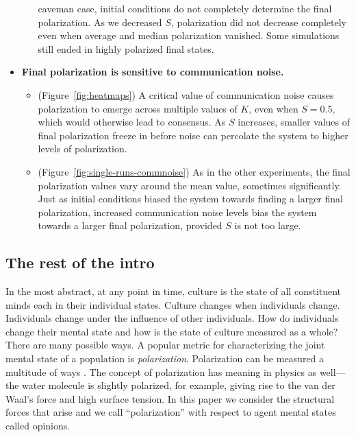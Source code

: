 \documentclass[11pt,letterpaper]{article}
\begin{document}
\begin{itemize}
\begin{itemize}
        caveman case, initial conditions do not completely determine the
        final polarization. As we decreased $S$, polarization did not 
        decrease completely even when average and median polarization vanished.
        Some simulations still ended in highly polarized final states.
    \end{itemize}
  \item \textbf{Final polarization is sensitive to communication noise.}    
    \begin{itemize}
      \item (Figure~\ref{fig:heatmaps}) A critical value of communication 
        noise causes polarization to emerge across multiple values of $K$, even
        when $S=0.5$, which would otherwise lead to consensus. As $S$ increases,
        smaller values of final polarization freeze in before noise can 
        percolate the system to higher levels of polarization.
      \item (Figure~\ref{fig:single-runs-commnoise}) As in the other experiments,
        the final polarization values vary around the mean value, sometimes
        significantly. Just as initial conditions biased the system towards
        finding a larger final polarization, increased communication noise
        levels bias the system towards a larger final polarization, provided
        $S$ is not too large.
    \end{itemize}
\end{itemize}

\subsection{The rest of the intro}

In the most abstract, at any point in time, culture is the state of all
constituent minds each in their individual states. Culture changes when 
individuals change. Individuals change under the influence of other 
individuals. How do individuals change their mental state and how is the
state of culture measured as a whole? There are many possible ways. A popular
metric for characterizing the joint mental state 
of a population is \emph{polarization}.
Polarization can be measured a multitude of ways \cite{Bramson2016}. The 
concept of polarization has meaning in physics as well---the water molecule
is slightly polarized, for example, giving rise to the van der Waal's force
and high surface tension. In this paper we consider the structural forces that
arise and we call ``polarization'' with respect to agent mental states called
opinions. 
\end{document}

